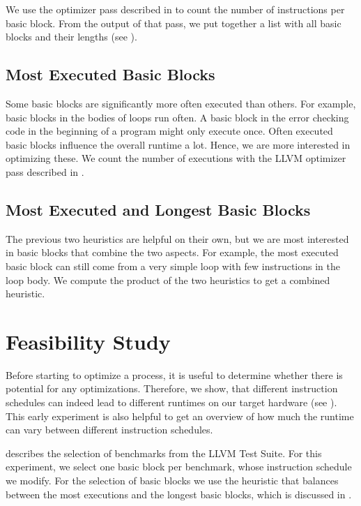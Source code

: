 We use the optimizer pass described in  to count the number of instructions per basic block.
From the output of that pass, we put together a list with all basic blocks and their lengths (see ).

\subsection{Most Executed Basic Blocks}
Some basic blocks are significantly more often executed than others.
For example, basic blocks in the bodies of loops run often.
A basic block in the error checking code in the beginning of a program might only execute once.
Often executed basic blocks influence the overall runtime a lot.
Hence, we are more interested in optimizing these.
We count the number of executions with the LLVM optimizer pass described in .


\subsection{Most Executed and Longest Basic Blocks}
\label{sec:approach:basicblock:exec-long}
The previous two heuristics are helpful on their own, but we are most interested in basic blocks that combine the two aspects.
For example, the most executed basic block can still come from a very simple loop with few instructions in the loop body.
We compute the product of the two heuristics to get a combined heuristic.

\section{Feasibility Study}
\label{sec:approach:feasibility-study}
Before starting to optimize a process, it is useful to determine whether there is potential for any optimizations.
Therefore, we show, that different instruction schedules can indeed lead to different runtimes on our target hardware (see ).
This early experiment is also helpful to get an overview of how much the runtime can vary between different instruction schedules.

 describes the selection of benchmarks from the LLVM Test Suite.
For this experiment, we select one basic block per benchmark, whose instruction schedule we modify.
For the selection of basic blocks we use the heuristic that balances between the most executions and the longest basic blocks, which is discussed in .

